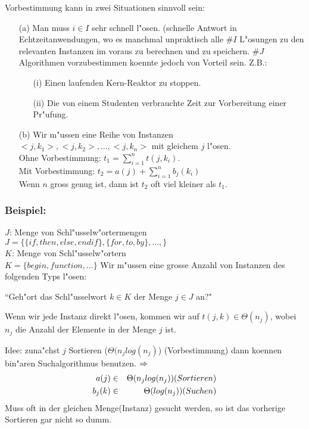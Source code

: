 \documentclass[a4paper]{scrartcl}
\begin{document}
Vorbestimmung kann in zwei Situationen sinnvoll sein:
\begin{itemize}
\item[(a)] Man muss $i\in I$ sehr schnell l"osen. (schnelle Antwort in Echtzeitanwendungen, wo es manchmal unpraktisch alle $\#I$ L"osungen zu den relevanten Instanzen im voraus zu berechnen und zu speichern. $\#J$ Algorithmen vorzubestimmen koennte jedoch von Vorteil sein. Z.B.: 
	\begin{itemize}
		\item[(i)] Einen laufenden Kern-Reaktor zu stoppen.
		\item[(ii)] Die von einem Studenten verbrauchte Zeit zur Vorbereitung einer Pr"ufung.	
	\end{itemize}
\item[(b)] Wir m"ussen eine Reihe von Instanzen $<j,k_1>,<j,k_2>,\dots,<j,k_n>$ mit gleichem $j$ l"osen.\\
	Ohne Vorbestimmung: $t_1=\sum_{i=1}^{n}t(j,k_i)$. \\
	Mit Vorbestimmung: $t_2=a(j)+\sum_{i=1}^{n}b_j(k_i)$ \\
	Wenn $n$ gross genug ist, dann ist $t_2$ oft viel kleiner als $t_1$.
\end{itemize}
\subsubsection*{Beispiel:}
 $J$: Menge von Schl"usselw"ortermengen\\
 $J=\{\{if,then,else,endif\},\{for,to,by\},\dots,\}$\\
 $K$: Menge von Schl"usselw"ortern\\
 $K=\{begin,function,\dots\}$
Wir m"ussen eine grosse Anzahl von Instanzen des folgenden Typs l"osen:
\begin{center}
	``Geh"ort das Schl"usselwort $k\in K$ der Menge $j\in J$ an?"
\end{center}

Wenn wir jede Instanz direkt l"osen, kommen wir auf $t(j,k)\in \Theta(n_j)$, wobei $n_j$ die Anzahl der Elemente in der Menge $j$ ist.

Idee: zuna"chst $j$ Sortieren ($\Theta(n_jlog(n_j)$) (Vorbestimmung) dann koennen bin"aren Suchalgorithmus benutzen. $\Rightarrow$
\begin{eqnarray*}
	 a(j)  &\in& \Theta(n_j log(n_j))  \text(Sortieren)\\
	 b_j(k)&\in& \Theta(log(n_j))      \text(Suchen) \\
\end{eqnarray*}
Muss oft in der gleichen Menge(Instanz) gesucht werden, so ist das vorherige Sortieren gar nicht so dumm.
\end{document}
